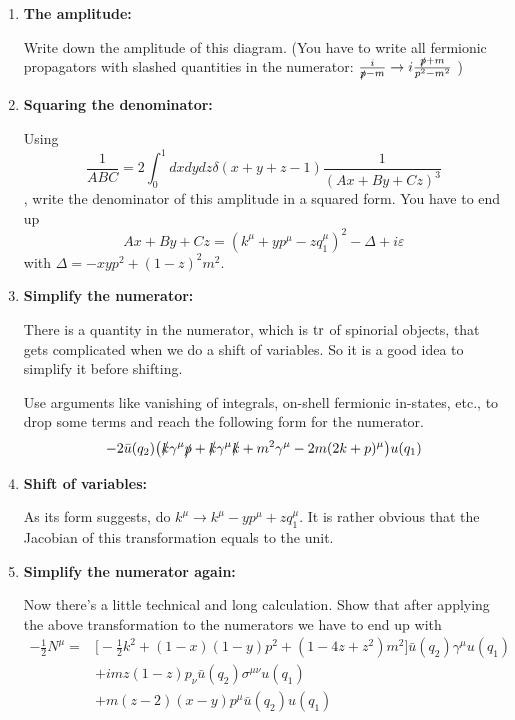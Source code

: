 \documentclass[11pt]{article}
\begin{document}
\begin{enumerate}
	\item
	\begin{problem}{\points{-}}
		\textbf{The amplitude:}
		
		Write down the amplitude of this diagram. (You have to write all fermionic propagators with slashed quantities in the numerator: $\frac{i}{\slashed{p}-m} \to i\frac{\slashed{p}+m}{p^2-m^2}$ )
	\end{problem}
\item
\begin{problem}{\points{-}}
	\textbf{Squaring the denominator:}
	
	Using 
	\[
	\frac{1}{ABC} = 2\int_0^1 dxdydz \delta(x+y+z-1) \frac{1}{(Ax+By+Cz)^3}
	\],
	write the denominator of this amplitude in a squared form. You have to end up 
	\[
	Ax+By+Cz = (k^\mu + yp^\mu -zq_1^\mu)^2 - \Delta +i\varepsilon
	\]
	with $\Delta = -xyp^2 + (1-z)^2m^2$.
	
\end{problem}
\item
\begin{problem}{\points{-}}
	\textbf{Simplify the numerator:}
	
	There is a quantity in the numerator, which is $\tr$ of spinorial objects, that gets complicated when we do a shift of variables. So it is a good idea to simplify it before shifting.
	
	Use arguments like vanishing of integrals, on-shell fermionic in-states, etc., to drop some terms and reach the following form for the numerator.
	\[
	-2 \bar{u}(q_2) \big(
	\slashed{k} \gamma^\mu \slashed{p} + \slashed{k} \gamma^\mu \slashed{k} + m^2 \gamma^\mu - 2m(2k+p)^\mu
	\big)
	u(q_1)
	\]
	
\end{problem}
\item
\begin{problem}{\points{-}}
	\textbf{Shift of variables:}
	
	As its form suggests, do $k^\mu \to k^\mu -yp^\mu +zq_1^\mu$. It is rather obvious that the Jacobian of this transformation equals to the unit.
	
\end{problem}
\item
\begin{problem}{\points{-}}
	\textbf{Simplify the numerator again:}
	
		Now there's a little technical and long calculation. Show that after applying the above transformation to the numerators we have to end up with
		\begin{equation}
			\begin{aligned}
			-\frac12 N^\mu = &\Big[
			-\frac12 k^2 + (1-x)(1-y)p^2 + (1-4z+z^2)m^2
			\Big] \bar{u}(q_2)\gamma^\mu u(q_1)
			\\&
			+imz(1-z) p_\nu \bar{u}(q_2)\sigma^{\mu\nu}u(q_1) 
			\\&
			+ m(z-2)(x-y)p^\mu \bar{u}(q_2)u(q_1)
		\end{aligned}
	\label{boringeq}
		\end{equation}
	

\end{problem}
\end{enumerate}
\end{document}
